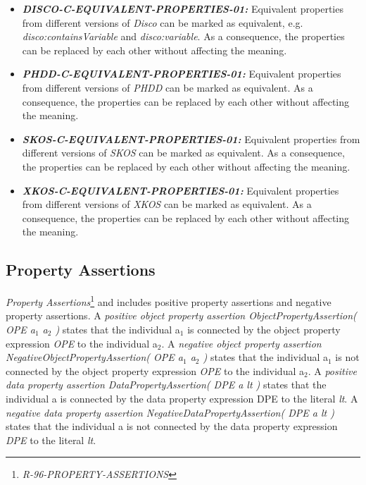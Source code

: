 \documentclass{llncs}
\begin{document}
\begin{itemize}
	\item \textbf{{\em DISCO-C-EQUIVALENT-PROPERTIES-01:}}
	Equivalent properties from different versions of \emph{Disco} can be marked as equivalent, e.g. \emph{disco:containsVariable} and \emph{disco:variable}. 
	As a consequence, the properties can be replaced by each other without affecting the meaning.
\end{itemize}

\begin{itemize}
	\item \textbf{{\em PHDD-C-EQUIVALENT-PROPERTIES-01:}}
	Equivalent properties from different versions of \emph{PHDD} can be marked as equivalent. 
	As a consequence, the properties can be replaced by each other without affecting the meaning.
\end{itemize}

\begin{itemize}
	\item \textbf{{\em SKOS-C-EQUIVALENT-PROPERTIES-01:}}
	Equivalent properties from different versions of \emph{SKOS} can be marked as equivalent. 
	As a consequence, the properties can be replaced by each other without affecting the meaning.
\end{itemize}

\begin{itemize}
	\item \textbf{{\em XKOS-C-EQUIVALENT-PROPERTIES-01:}}
	Equivalent properties from different versions of \emph{XKOS} can be marked as equivalent. 
	As a consequence, the properties can be replaced by each other without affecting the meaning.
\end{itemize}

\subsection{Property Assertions}

\emph{{Property Assertions}}\footnote{\emph{R-96-PROPERTY-ASSERTIONS}}
and includes positive property assertions and negative property assertions.
A \emph{positive object property assertion ObjectPropertyAssertion( OPE a$_1$ a$_2$ )} states that the individual a$_1$ is connected by the object property expression \emph{OPE} to the individual a$_2$. 
A \emph{negative object property assertion NegativeObjectPropertyAssertion( OPE a$_1$ a$_2$ )} states that the individual a$_1$ is not connected by the object property expression \emph{OPE} to the individual a$_2$. 
A \emph{positive data property assertion DataPropertyAssertion( DPE a lt )} states that the individual a is connected by the data property expression DPE to the literal \emph{lt}. 
A \emph{negative data property assertion NegativeDataPropertyAssertion( DPE a lt )} states that the individual a is not connected by the data property expression \emph{DPE} to the literal \emph{lt}.
\end{document}
